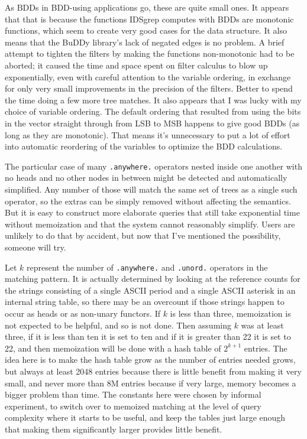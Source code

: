 \documentclass[twocolumn]{report}
\begin{document}
As BDDs in BDD-using applications go, these are quite small ones.  It
appears that that is because the functions IDSgrep computes with BDDs are
monotonic functions, which seem to create very good cases for the data
structure.  It also means that the BuDDy library's lack of negated edges is
no problem.  A brief attempt to tighten the filters by making the functions
non-monotonic had to be aborted; it caused the time and space spent on
filter calculus to blow up exponentially, even with careful attention to the
variable ordering, in exchange for only very small improvements in the
precision of the filters.  Better to spend the time doing a few more tree
matches.  It also appears that I was lucky with my choice of variable
ordering.  The default ordering that resulted from using the bits in the
vector straight through from LSB to MSB happens to give good BDDs (as
long as they are monotonic).  That means it's unnecessary to put a lot of
effort into automatic reordering of the variables to optimize the BDD
calculations.

The particular case of many \texttt{.anywhere.} operators nested inside one
another with no heads and no other nodes in between might be detected and
automatically simplified.  Any number of those will match the same set of
trees as a single such operator, so the extras can be simply removed without
affecting the semantics.  But it is easy to construct more elaborate queries
that still take exponential time without memoization and that the system
cannot reasonably simplify.  Users are unlikely to do that by accident, but
now that I've mentioned the possibility, someone will try.

Let $k$ represent the number of \texttt{.anywhere.} and \texttt{.unord.}
operators in the matching pattern.  It is actually determined
by looking at the reference counts for the strings consisting of a single
ASCII period and a single ASCII asterisk in an internal string table, so
there may be an overcount if those strings happen to occur as heads or
as non-unary functors.  If $k$ is less than three, memoization is not
expected to be helpful, and so is not done.  Then assuming $k$ was at least
three, if it is less than ten it is set to ten and if it is greater than 22
it is set to 22, and then memoization will be done with a hash table of
$2^{k+1}$ entries.  The idea here is to make the hash table grow as the
number of entries needed grows, but always at least 2048 entries because
there is little benefit from making it very small, and never more than 8M
entries because if very large, memory becomes a bigger problem than time. 
The constants here were chosen by informal experiment, to switch over to
memoized matching at the level of query complexity where it starts to be
useful, and keep the tables just large enough that making them significantly
larger provides little benefit.
\end{document}
